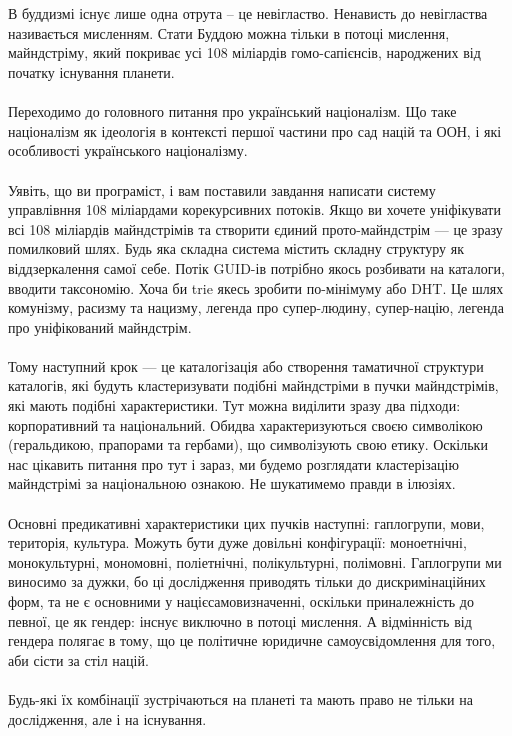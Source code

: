 \\
\\
В буддизмі існує лише одна отрута -- це невігластво. Ненависть до невігластва називається мисленням.
Стати Буддою можна тільки в потоці мислення, майндстріму, який покриває усі 108 міліардів гомо-сапієнсів,
народжених від початку існування планети.
\\
\\
Переходимо до головного питання про український націоналізм. Що таке націоналізм як ідеологія в контексті
першої частини про сад націй та ООН, і які особливості українського націоналізму.
\\
\\
Уявіть, що ви програміст, і вам поставили завдання написати систему управлівння 108 міліардами корекурсивних потоків.
Якщо ви хочете уніфікувати всі 108 міліардів майндстрімів та створити єдиний прото-майндстрім --- це зразу помилковий шлях.
Будь яка складна система містить складну структуру як віддзеркалення самої себе. Потік GUID-ів потрібно якось
розбивати на каталоги, вводити таксономію. Хоча би trie якесь зробити по-мінімуму або DHT. Це шлях комунізму, расизму та нацизму,
легенда про супер-людину, супер-націю, легенда про уніфікований майндстрім.
\\
\\
Тому наступний крок --- це каталогізація або створення таматичної структури каталогів, які будуть кластеризувати
подібні майндстріми в пучки майндстрімів, які мають подібні характеристики. Тут можна виділити зразу два підходи:
корпоративний та національний. Обидва характеризуються своєю символікою (геральдикою, прапорами та гербами), що
символізують свою етику. Оскільки нас цікавить питання про тут і зараз, ми будемо розглядати кластерізацію
майндстрімі за національною ознакою. Не шукатимемо правди в ілюзіях.
\\
\\
Основні предикативні характеристики цих пучків наступні: гаплогрупи, мови, територія, культура.
Можуть бути дуже довільні конфігурації: моноетнічні, монокультурні, мономовні, поліетнічні, полікультурні, полімовні.
Гаплогрупи ми виносимо за дужки, бо ці дослідження приводять тільки до дискримінаційних форм, та не є основними
у націєсамовизначенні, оскільки приналежність до певної, це як гендер: інснує виключно в потоці мислення.
А відмінність від гендера полягає в тому, що це політичне юридичне самоусвідомлення для того, аби сісти за стіл націй.
\\
\\
Будь-які їх комбінації зустрічаються на планеті та мають право не тільки на дослідження, але і на існування.
